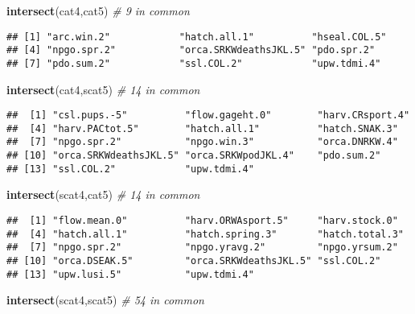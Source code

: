 \documentclass[]{article}
\newenvironment{Shaded}{\begin{snugshade}}{\end{snugshade}}
\newcommand{\KeywordTok}[1]{\textcolor[rgb]{0.13,0.29,0.53}{\textbf{{#1}}}}
\newcommand{\CommentTok}[1]{\textcolor[rgb]{0.56,0.35,0.01}{\textit{{#1}}}}
\newcommand{\NormalTok}[1]{{#1}}
\begin{document}
\begin{Shaded}
\begin{Highlighting}[]
\KeywordTok{intersect}\NormalTok{(cat4,cat5) }\CommentTok{# 9 in common}
\end{Highlighting}
\end{Shaded}

\begin{verbatim}
## [1] "arc.win.2"            "hatch.all.1"          "hseal.COL.5"         
## [4] "npgo.spr.2"           "orca.SRKWdeathsJKL.5" "pdo.spr.2"           
## [7] "pdo.sum.2"            "ssl.COL.2"            "upw.tdmi.4"
\end{verbatim}

\begin{Shaded}
\begin{Highlighting}[]
\KeywordTok{intersect}\NormalTok{(cat4,scat5) }\CommentTok{# 14 in common}
\end{Highlighting}
\end{Shaded}

\begin{verbatim}
##  [1] "csl.pups.-5"          "flow.gageht.0"        "harv.CRsport.4"      
##  [4] "harv.PACtot.5"        "hatch.all.1"          "hatch.SNAK.3"        
##  [7] "npgo.spr.2"           "npgo.win.3"           "orca.DNRKW.4"        
## [10] "orca.SRKWdeathsJKL.5" "orca.SRKWpodJKL.4"    "pdo.sum.2"           
## [13] "ssl.COL.2"            "upw.tdmi.4"
\end{verbatim}

\begin{Shaded}
\begin{Highlighting}[]
\KeywordTok{intersect}\NormalTok{(scat4,cat5) }\CommentTok{# 14 in common}
\end{Highlighting}
\end{Shaded}

\begin{verbatim}
##  [1] "flow.mean.0"          "harv.ORWAsport.5"     "harv.stock.0"        
##  [4] "hatch.all.1"          "hatch.spring.3"       "hatch.total.3"       
##  [7] "npgo.spr.2"           "npgo.yravg.2"         "npgo.yrsum.2"        
## [10] "orca.DSEAK.5"         "orca.SRKWdeathsJKL.5" "ssl.COL.2"           
## [13] "upw.lusi.5"           "upw.tdmi.4"
\end{verbatim}

\begin{Shaded}
\begin{Highlighting}[]
\KeywordTok{intersect}\NormalTok{(scat4,scat5) }\CommentTok{# 54 in common}
\end{Highlighting}
\end{Shaded}
\end{document}
